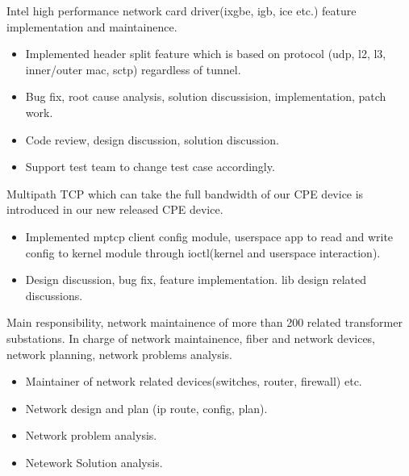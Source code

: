 \documentclass{resume}
\begin{document}
Intel high performance network card driver(ixgbe, igb, ice etc.) feature implementation and maintainence.
\begin{itemize}
\item Implemented header split feature which is based on protocol (udp, l2, l3, inner/outer mac, sctp) regardless of tunnel.
\item Bug fix, root cause analysis, solution discussision, implementation, patch work. 
\item Code review, design discussion, solution discussion.
\item Support test team to change test case accordingly.
\end{itemize}

Multipath TCP which can take the full bandwidth of our CPE device  is introduced in our new released CPE device.
\begin{itemize}
\item Implemented mptcp client config module, userspace app to read and write config to kernel module through ioctl(kernel and userspace interaction).
\item Design discussion, bug fix, feature implementation. lib design related discussions. 
\end{itemize}

Main responsibility, network maintainence of more than 200 related transformer substations.
In charge of network maintainence, fiber and network devices, network planning, network problems analysis.
\begin{itemize}
\item Maintainer of network related devices(switches, router, firewall) etc.
\item Network design and plan (ip route, config, plan).
\item Network problem analysis.
\item Netework Solution analysis.
\end{itemize}


\end{document}
